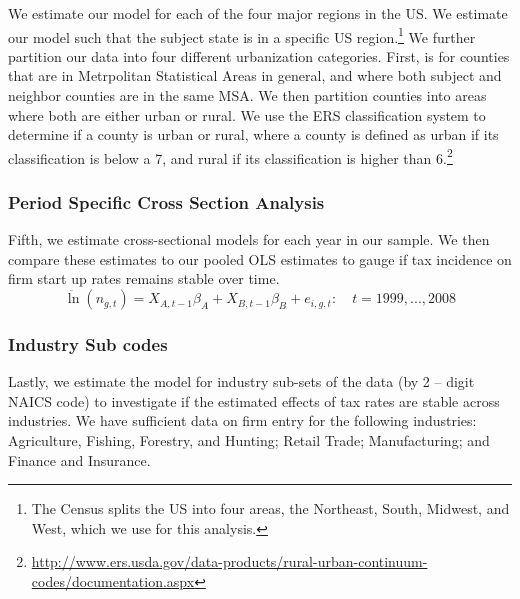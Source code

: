 We estimate our model for each of the four major regions in the US. We estimate our model such that the subject state is in a specific US region.\footnote{The Census splits the US into four areas,  the Northeast, South, Midwest, and West, which we use for this analysis.} We further partition our data into four different urbanization categories. First, is for counties that are in Metrpolitan Statistical Areas in general, and where both subject and neighbor counties are in the same MSA. We then partition counties into areas where both are  either urban or rural. We use the ERS classification system to determine if a county is urban or rural, where a county is defined as urban if its classification is below a 7, and rural if its classification is higher than 6.\footnote{\url{http://www.ers.usda.gov/data-products/rural-urban-continuum-codes/documentation.aspx}}

\subsubsection{Period Specific Cross Section Analysis}
Fifth, we estimate cross-sectional models for each year in our sample. We then compare these estimates to our pooled OLS estimates to gauge if tax incidence on firm start up rates remains stable over time.
\begin{equation}\label{sense2}
\ddot \ln(n_{g,t})  = X_{A,t-1}\beta_{A}+X_{B,t-1}\beta_{B}+ e_{i,g,t}: \quad t = 1999,...,2008
\end{equation}

\subsubsection{Industry Sub codes}

Lastly, we estimate the model for industry sub-sets of the data (by 2 – digit NAICS code) to investigate if the estimated effects of tax rates are stable across industries.  We have sufficient data on firm entry for the following industries: Agriculture, Fishing, Forestry, and Hunting; Retail Trade; Manufacturing; and Finance and Insurance.